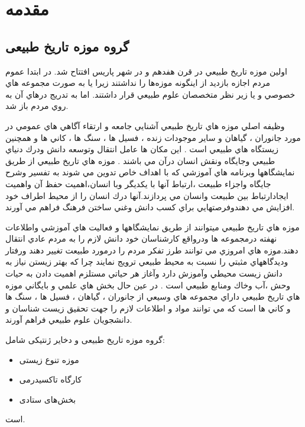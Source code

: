
\chapter{مقدمه} \label{chapter:introduction}

\paragraph*{}

\section{گروه موزه تاریخ طبیعی}
اولين موزه تاريخ طبيعي در قرن
هفدهم و در شهر پاريس افتتاح شد.
در ابتدا عموم مردم اجازه بازديد از اينگونه موزه‌ها را نداشتند زيرا يا به
صورت مجموعه هاي خصوصي و يا زير نظر متخصصان علوم طبيعي قرار داشتند. اما به تدريج درهاي آن به
روي مردم باز شد.

وظيفه اصلي موزه هاي تاريخ طبيعي آشنايي جامعه و ارتقاء آگاهي هاي عمومي در مورد جانوران ، گياهان و 
ساير موجودات زنده ، فسيل ها ، سنگ ها ، كاني ها و همچنين زيستگاه هاي طبيعي است . اين مكان ها 
عامل انتقال وتوسعه دانش ودرك دنياي طبيعي وجايگاه ونقش انسان درآن مي باشند . موزه هاي تاريخ طبيعي
از طريق نمايشگاهها وبرنامه هاي آموزشي كه با اهداف خاص تدوين مي شوند به تفسير وشرح جايگاه واجزاء
طبيعت ،ارتباط آنها با يكديگر وبا انسان،اهميت حفظ آن واهميت ايجادارتباط بين طبيعت وانسان مي
پردازند.آنها درك انسان را از محيط اطراف خود افزايش مي دهندوفرصتهايي براي كسب دانش وغني ساختن
فرهنگ فراهم مي آورند.

موزه هاي تاريخ طبيعي ميتوانند از طريق نمايشگاهها و فعاليت هاي آموزشي واطلاعات
نهفته درمجموعه ها ودرواقع كارشناسان خود دانش لازم را به مردم عادي انتقال دهند.موزه هاي امروزي مي
توانند طرز تفكر مردم را درمورد طبيعت تغيير دهند ورفتار وديدگاههاي مثبتي را نسبت به محيط طبيعي
ترويج نمايند چرا كه بهتر زيستن نياز به دانش زيست محيطي وآموزش دارد وآغاز هر حياتي مستلزم اهميت
دادن به حيات وحش ،آب وخاك ومنابع طبيعي است . در عين حال بخش هاي علمي و بايگاني موزه هاي تاريخ
طبيعي داراي مجموعه هاي وسيعي از جانوران ، گياهان ، فسيل ها ، سنگ ها و كاني ها است كه مي توانند مواد
و اطلاعات لازم را جهت تحقيق زيست شناسان و دانشجويان علوم طبيعي فراهم آورند.


\newpage

گروه موزه تاریخ طبیعی و دخایر ژنتیکی شامل:
\begin{itemize}
    \item موزه تنوع زیستی
    \item کارگاه تاکسیدرمی
    \item بخش‌های ستادی
\end{itemize}
است.

